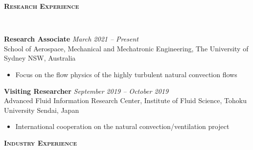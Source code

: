 \documentclass[letterpaper, 10pt]{article}
\newenvironment{changemargin}[2]{%
  \begin{list}{}{%
      \setlength{\topsep}{0pt}%
      \setlength{\leftmargin}{#1}%
      \setlength{\rightmargin}{#2}%
      \setlength{\listparindent}{\parindent}%
      \setlength{\itemindent}{\parindent}%
      \setlength{\parsep}{\parskip}%
    }%
  \item[]}{\end{list}
}
\newcommand{\lineover}{
  \begin{changemargin}{-0.05in}{-0.05in}
    \vspace*{-8pt}
    \hrulefill \\
    \vspace*{-2pt}
  \end{changemargin}
}
\newcommand{\header}[1]{
  \begin{changemargin}{-0.5in}{-0.5in}
    \textbf{\scshape{#1}}\\
    \lineover
  \end{changemargin}
}
\newenvironment{body} {
  \vspace*{-16pt}
  \begin{changemargin}{-0.25in}{-0.5in}
  }
  {\end{changemargin}
}
\begin{document}
\header{Research Experience}
\begin{body}
	\vspace{14pt}
	\textbf{Research Associate}\hfill
	\emph{March 2021 -- Present} \\
	School of Aerospace, Mechanical and Mechatronic Engineering, The University of Sydney   \hfill NSW, Australia
	\vspace{-2pt}
	\begin{itemize}
		\setlength{\itemindent}{0in}
		\setlength{\itemsep}{0in}
		\item Focus on the flow physics of the highly turbulent natural convection flows 
	\end{itemize}

	\vspace{14pt}
	\textbf{Visiting Researcher}\hfill
	\emph{September 2019 -- October 2019} \\
	Advanced Fluid Information Research Center, Institute of Fluid Science, Tohoku University   \hfill Sendai, Japan
	\vspace{-2pt}
	\begin{itemize}
		\setlength{\itemindent}{0in}
		\setlength{\itemsep}{0in}
		\item International cooperation on the natural convection/ventilation project 
	\end{itemize}

	
\end{body}
\smallskip
\header{Industry Experience}
\end{document}
